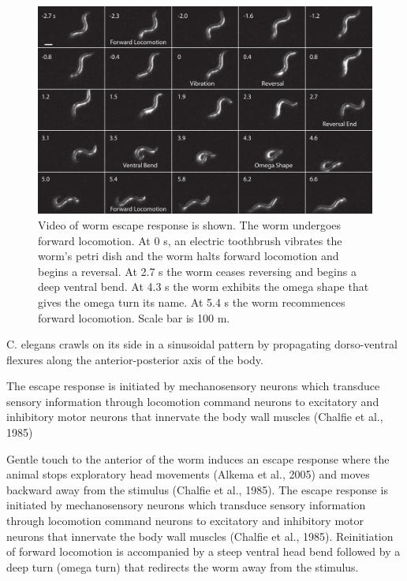 \begin{figure}  %
\includegraphics[width=\textwidth]{figures/omegaMontage}
\caption[Video of worm escape response.]{Video of worm escape response is shown. The worm undergoes forward locomotion.  At 0 s, an electric toothbrush vibrates the worm's petri dish and the worm halts forward locomotion and begins a reversal. At 2.7 s the worm ceases reversing and begins a deep ventral bend. At 4.3 s the worm exhibits the omega shape that gives the omega turn its name. At 5.4 s the worm recommences forward locomotion. Scale bar is 100 \textmu m.
\label{fig:omegaMontage}}
\end{figure}



C. elegans crawls on its side in a sinusoidal pattern by propagating dorso-ventral flexures along the anterior-posterior axis of the body.  






 The escape response is initiated by mechanosensory neurons which transduce sensory information through locomotion command neurons to excitatory and inhibitory motor neurons that innervate the body wall muscles (Chalfie et al., 1985)



Gentle touch to the anterior of the worm induces an escape response where the animal stops exploratory head movements (Alkema et al., 2005) and moves backward away from the stimulus (Chalfie et al., 1985).  The escape response is initiated by mechanosensory neurons which transduce sensory information through locomotion command neurons to excitatory and inhibitory motor neurons that innervate the body wall muscles (Chalfie et al., 1985).  Reinitiation of forward locomotion is accompanied by a steep ventral head bend followed by a deep turn (omega turn) that redirects the worm away from the stimulus.  


